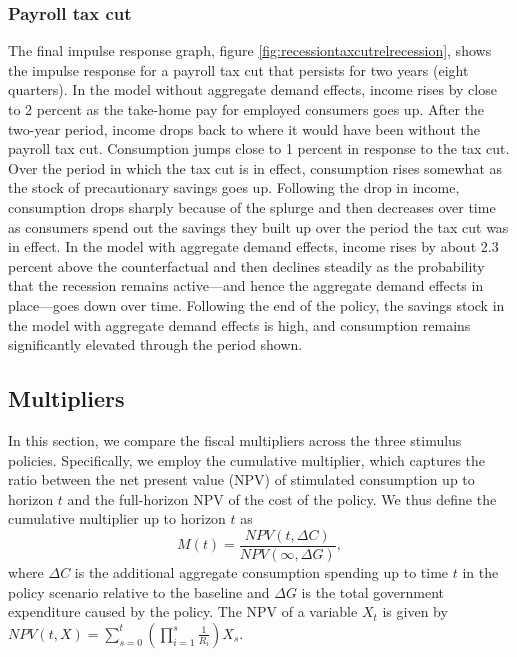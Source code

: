 \documentclass[\econtexRoot/HAFiscal]{subfiles}
\begin{document}
\subsubsection{Payroll tax cut}



The final impulse response graph, figure \ref{fig:recessiontaxcutrelrecession}, shows the impulse response for a payroll tax cut that persists for two years (eight quarters).
In the model without aggregate demand effects, income rises by close to 2 percent as the take-home pay for employed consumers goes up.
After the two-year period, income drops back to where it would have been without the payroll tax cut.
Consumption jumps close to 1 percent in response to the tax cut.
Over the period in which the tax cut is in effect, consumption rises somewhat as the stock of precautionary savings goes up.
Following the drop in income, consumption drops sharply because of the splurge and then decreases over time as consumers spend out the savings they built up over the period the tax cut was in effect.
In the model with aggregate demand effects, income rises by about 2.3 percent above the counterfactual and then declines steadily as the probability that the recession remains active---and hence the aggregate demand effects in place---goes down over time.
Following the end of the policy, the savings stock in the model with aggregate demand effects is high, and consumption remains significantly elevated through the period shown.

\hypertarget{multipliers}{}\par\subsection{Multipliers}
\notinsubfile{\label{sec:multipliers}}

In this section, we compare the fiscal multipliers across the three stimulus policies.
Specifically, we employ the cumulative multiplier, which captures the ratio between the net present value (NPV) of stimulated consumption up to horizon $t$ and the full-horizon NPV of the cost of the policy.
We thus define the cumulative multiplier up to horizon $t$ as
\begin{equation}
	\label{eqn:cumMultiplier}
  M(t) = \frac{NPV(t,\Delta C)}{NPV (\infty,\Delta G)},
\end{equation}
where $\Delta C$ is the additional aggregate consumption spending up to time $t$ in the policy scenario relative to the baseline and $\Delta G$ is the total government expenditure caused by the policy.
The NPV of a variable $X_t$ is given by 
$NPV(t,X) = \sum_{s=0}^{t} \left( \prod_{i=1}^{s} \frac{1}{R_i} \right) X_s$.
\end{document}
